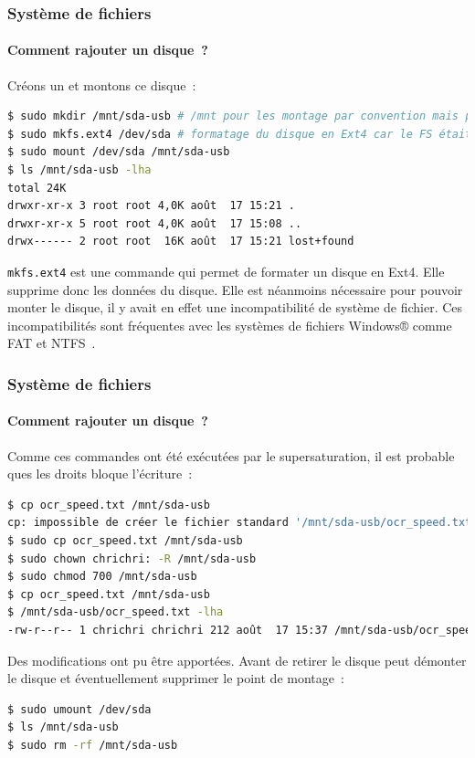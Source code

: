 \documentclass{beamer}
\begin{document}
    \begin{frame}[fragile]
        \transdissolve
        \frametitle{Système de fichiers}
        \framesubtitle{Comment rajouter un disque~?}
        Créons un  et montons ce disque~:
        \begin{lstlisting}[language=bash]
$ sudo mkdir /mnt/sda-usb # /mnt pour les montage par convention mais peut être ailleurs
$ sudo mkfs.ext4 /dev/sda # formatage du disque en Ext4 car le FS était incompatible
$ sudo mount /dev/sda /mnt/sda-usb
$ ls /mnt/sda-usb -lha
total 24K
drwxr-xr-x 3 root root 4,0K août  17 15:21 .
drwxr-xr-x 5 root root 4,0K août  17 15:08 ..
drwx------ 2 root root  16K août  17 15:21 lost+found
        \end{lstlisting}
        \begin{dangercolorbox}
            \lstinline{mkfs.ext4} est une commande qui permet de formater un disque en Ext4.
            Elle supprime donc les données du disque.
            Elle est néanmoins nécessaire pour pouvoir monter le disque, il y avait en effet une incompatibilité de système de fichier.
            Ces incompatibilités sont fréquentes avec les systèmes de fichiers Windows® comme FAT et NTFS~.
        \end{dangercolorbox}
    \end{frame}

    \begin{frame}[fragile]
        \transdissolve
        \frametitle{Système de fichiers}
        \framesubtitle{Comment rajouter un disque~?}
        Comme ces commandes ont été exécutées par le supersaturation, il est probable ques les droits bloque l'écriture~:
        \begin{lstlisting}[language=bash]
$ cp ocr_speed.txt /mnt/sda-usb
cp: impossible de créer le fichier standard '/mnt/sda-usb/ocr_speed.txt': Permission non accordée
$ sudo cp ocr_speed.txt /mnt/sda-usb
$ sudo chown chrichri: -R /mnt/sda-usb
$ sudo chmod 700 /mnt/sda-usb
$ cp ocr_speed.txt /mnt/sda-usb
$ /mnt/sda-usb/ocr_speed.txt -lha
-rw-r--r-- 1 chrichri chrichri 212 août  17 15:37 /mnt/sda-usb/ocr_speed.txt
        \end{lstlisting}
        Des modifications ont pu être apportées.
        \bigbreak
        Avant de retirer le disque peut démonter le disque et éventuellement supprimer le point de montage~:
        \begin{lstlisting}[language=bash]
$ sudo umount /dev/sda
$ ls /mnt/sda-usb
$ sudo rm -rf /mnt/sda-usb
        \end{lstlisting}
    \end{frame}
\end{document}
